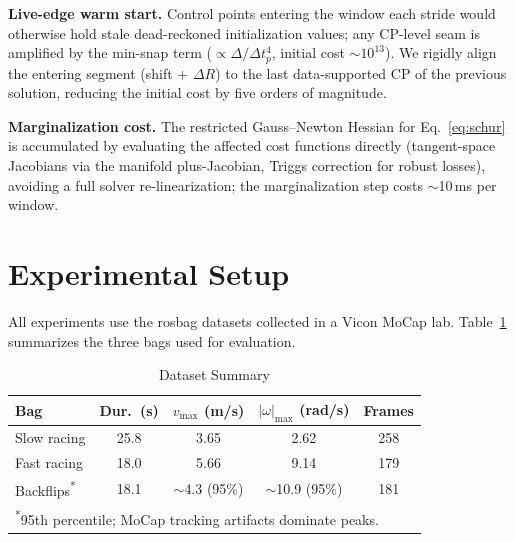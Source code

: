 \documentclass[journal]{IEEEtran}
\begin{document}
\textbf{Live-edge warm start.}
Control points entering the window each stride would otherwise hold
stale dead-reckoned initialization values; any CP-level seam is
amplified by the min-snap term ($\propto \Delta/\Delta t_p^4$, initial
cost $\sim$$10^{13}$).  We rigidly align the entering segment (shift +
$\Delta R$) to the last data-supported CP of the previous solution,
reducing the initial cost by five orders of magnitude.

\textbf{Marginalization cost.}
The restricted Gauss--Newton Hessian for Eq.~\eqref{eq:schur} is
accumulated by evaluating the affected cost functions directly
(tangent-space Jacobians via the manifold plus-Jacobian, Triggs
correction for robust losses), avoiding a full solver re-linearization;
the marginalization step costs $\sim$10\,ms per window.

\section{Experimental Setup}
\label{sec:setup}

All experiments use the rosbag datasets collected in a Vicon MoCap
lab.  Table~\ref{tab:datasets} summarizes the three bags used for
evaluation.

\begin{table}[t]
\centering
\caption{Dataset Summary}
\label{tab:datasets}
\small
\begin{tabular}{@{}lcccc@{}}
\toprule
Bag & Dur.\ (s) & $v_{\max}$ (m/s) & $|\omega|_{\max}$ (rad/s) & Frames \\
\midrule
Slow racing & 25.8 & 3.65 & 2.62 & 258 \\
Fast racing & 18.0 & 5.66 & 9.14 & 179 \\
Backflips\textsuperscript{*} & 18.1 & $\sim$4.3 (95\%) & $\sim$10.9 (95\%) & 181 \\
\bottomrule
\multicolumn{5}{l}{\textsuperscript{*}95th percentile; MoCap tracking artifacts dominate peaks.}
\end{tabular}
\end{table}
\end{document}
